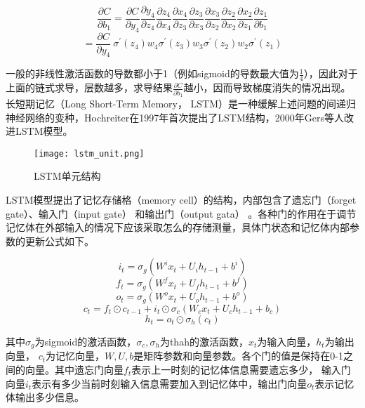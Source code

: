 \begin{equation}\label{nodelimiter}
\frac{\partial C}{\partial b_1} = \frac{\partial C}{\partial y_4}\frac{\partial y_4}{\partial z_4}\frac{\partial z_4}{\partial x_4}\frac{\partial x_4}{\partial z_3}\frac{\partial z_3}{\partial x_3}\frac{\partial x_3}{\partial z_2}\frac{\partial z_2}{\partial x_2}\frac{\partial x_2}{\partial z_1}\frac{\partial z_1}{\partial b_1}
\end{equation}
\begin{equation}\label{delimiter}
=\frac{\partial C}{\partial y_4}\ \sigma ^\prime(z_4)w_4\sigma ^\prime(z_3)w_3\sigma ^\prime(z_2)w_2\sigma ^\prime(z_1)
\end{equation}

一般的非线性激活函数的导数都小于1（例如sigmoid的导数最大值为$\frac{1}{4}$），因此对于上面的链式求导，层数越多，求导结果$\frac{\partial C}{\partial b_1}$越小，因而导致梯度消失的情况出现。
长短期记忆（Long Short-Term Memory， LSTM）是一种缓解上述问题的间递归神经网络的变种，Hochreiter在1997年首次提出了LSTM结构，2000年Gers等人改进LSTM模型。

\begin{figure}[htbp]
	\centering
	\texttt{[image: lstm\_unit.png]}
	\caption[rnn_vanish]{LSTM单元结构}
\end{figure}

LSTM模型提出了记忆存储格（memory cell）的结构，内部包含了遗忘门（forget gate）、输入门（input gate） 和输出门（output gata） 。各种门的作用在于调节记忆体在外部输入的情况下应该采取怎么的存储测量，具体门状态和记忆体内部参数的更新公式如下。

\begin{equation}\label{lstm_f}i_t=\sigma_g(W^ix_t+U_ih_{t-1}+b^i)\end{equation}
\begin{equation}\label{lstm_f}f_t=\sigma_g(W^fx_t+U_fh_{t-1}+b^f)\end{equation}
\begin{equation}\label{lstm_f}o_t=\sigma_g(W^ox_t+U_oh_{t-1}+b^o)\end{equation}
\begin{equation}\label{lstm_f}c_t=f_t \odot c_{t-1}+i_t\odot \sigma_c(W_cx_t+U_ch_{t-1}+b_c)\end{equation}
\begin{equation}\label{lstm_f}h_t=o_t \odot \sigma_h(c_t)\end{equation}

其中$\sigma_g$为sigmoid的激活函数，$\sigma_c,\sigma_h$为thah的激活函数，$x_t$为输入向量，$h_t$为输出向量， $c_t$为记忆向量，$W,U,b$是矩阵参数和向量参数。各个门的值是保持在0-1之间的向量。其中遗忘门向量$f_t$表示上一时刻的记忆体信息需要遗忘多少， 输入门向量$i_t$表示有多少当前时刻输入信息需要加入到记忆体中，输出门向量$o_t$表示记忆体输出多少信息。

